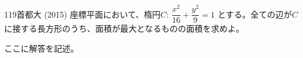 \begin{prob}{119}{}{首都大 (2015)}
 座標平面において、楕円$C$: $\dfrac{x^2}{16}+\dfrac{y^2}{9}=1$ とする。全ての辺が$C$に接する長方形のうち、面積が最大となるものの面積を求めよ。
\end{prob}
ここに解答を記述。